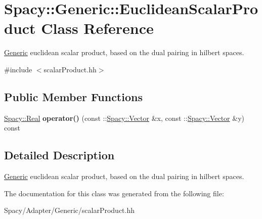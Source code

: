 \hypertarget{classSpacy_1_1Generic_1_1EuclideanScalarProduct}{}\section{Spacy\+:\+:Generic\+:\+:Euclidean\+Scalar\+Product Class Reference}
\label{classSpacy_1_1Generic_1_1EuclideanScalarProduct}


\hyperlink{namespaceSpacy_1_1Generic}{Generic} euclidean scalar product, based on the dual pairing in hilbert spaces.  




{\ttfamily \#include $<$scalar\+Product.\+hh$>$}

\subsection*{Public Member Functions}
\begin{DoxyCompactItemize}
\item 
\hypertarget{classSpacy_1_1Generic_1_1EuclideanScalarProduct_a7aa8a7d9b912b0a72386317435897f81}{}\hyperlink{classSpacy_1_1Real}{Spacy\+::\+Real} {\bfseries operator()} (const \+::\hyperlink{classSpacy_1_1Vector}{Spacy\+::\+Vector} \&x, const \+::\hyperlink{classSpacy_1_1Vector}{Spacy\+::\+Vector} \&y) const \label{classSpacy_1_1Generic_1_1EuclideanScalarProduct_a7aa8a7d9b912b0a72386317435897f81}

\end{DoxyCompactItemize}


\subsection{Detailed Description}
\hyperlink{namespaceSpacy_1_1Generic}{Generic} euclidean scalar product, based on the dual pairing in hilbert spaces. 

The documentation for this class was generated from the following file\+:\begin{DoxyCompactItemize}
\item 
Spacy/\+Adapter/\+Generic/scalar\+Product.\+hh\end{DoxyCompactItemize}
